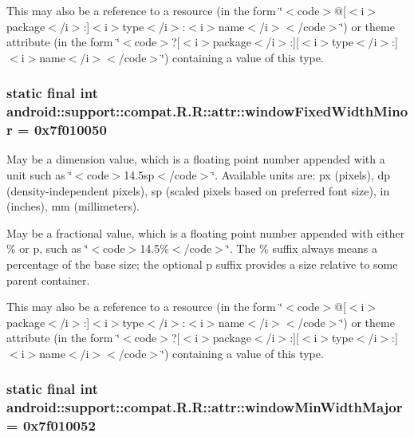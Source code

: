 This may also be a reference to a resource (in the form \char`\"{}$<$code$>$@\mbox{[}$<$i$>$package$<$/i$>$:\mbox{]}$<$i$>$type$<$/i$>$:$<$i$>$name$<$/i$>$$<$/code$>$\char`\"{}) or theme attribute (in the form \char`\"{}$<$code$>$?\mbox{[}$<$i$>$package$<$/i$>$:\mbox{]}\mbox{[}$<$i$>$type$<$/i$>$:\mbox{]}$<$i$>$name$<$/i$>$$<$/code$>$\char`\"{}) containing a value of this type. \hypertarget{classandroid_1_1support_1_1compat_1_1_r_1_1attr_043b8c6c0a06d86b897e5bfd5f426538}{
\subsubsection[{windowFixedWidthMinor}]{\setlength{\rightskip}{0pt plus 5cm}static final int android::support::compat.R.R::attr::windowFixedWidthMinor = 0x7f010050}}
\label{classandroid_1_1support_1_1compat_1_1_r_1_1attr_043b8c6c0a06d86b897e5bfd5f426538}


May be a dimension value, which is a floating point number appended with a unit such as \char`\"{}$<$code$>$14.5sp$<$/code$>$\char`\"{}. Available units are: px (pixels), dp (density-independent pixels), sp (scaled pixels based on preferred font size), in (inches), mm (millimeters). 

May be a fractional value, which is a floating point number appended with either \% or p, such as \char`\"{}$<$code$>$14.5\%$<$/code$>$\char`\"{}. The \% suffix always means a percentage of the base size; the optional p suffix provides a size relative to some parent container. 

This may also be a reference to a resource (in the form \char`\"{}$<$code$>$@\mbox{[}$<$i$>$package$<$/i$>$:\mbox{]}$<$i$>$type$<$/i$>$:$<$i$>$name$<$/i$>$$<$/code$>$\char`\"{}) or theme attribute (in the form \char`\"{}$<$code$>$?\mbox{[}$<$i$>$package$<$/i$>$:\mbox{]}\mbox{[}$<$i$>$type$<$/i$>$:\mbox{]}$<$i$>$name$<$/i$>$$<$/code$>$\char`\"{}) containing a value of this type. \hypertarget{classandroid_1_1support_1_1compat_1_1_r_1_1attr_c75373813fbe541ee5c3396d88a0a640}{
\subsubsection[{windowMinWidthMajor}]{\setlength{\rightskip}{0pt plus 5cm}static final int android::support::compat.R.R::attr::windowMinWidthMajor = 0x7f010052}}
\label{classandroid_1_1support_1_1compat_1_1_r_1_1attr_c75373813fbe541ee5c3396d88a0a640}


